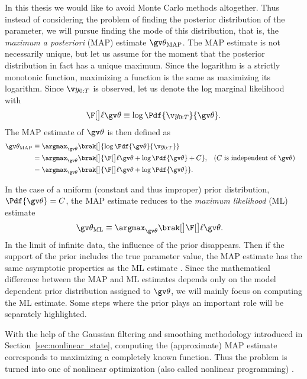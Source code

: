 In this thesis we would like to avoid Monte Carlo methods altogether. Thus instead
of considering the problem of finding the posterior distribution of the parameter,
we will pursue finding the mode of this distribution, that is, the \emph{maximum a posteriori} (MAP) estimate
$\Th_{\text{MAP}}$. The MAP estimate is not necessarily unique, 
but let us assume for the moment that the posterior distribution in fact
has a unique maximum. Since the logarithm is a strictly monotonic function, maximizing a function
is the same as maximizing its logarithm. 
Since $\Y$ is observed, let us denote 
the log marginal likelihood with 
\begin{align*}
	\lLH \equiv \log \Pdf{\Y}{\Th}.
\end{align*}
The MAP estimate of $\Th$ is then defined as 
\begin{align}
	\Th_{\text{MAP}} &\equiv \argmax_{\Th}\brak[\big]{ \log\Pdf{\Th}{\Y}} \nonumber\\ 
	&=\argmax_{\Th}\brak[\big]{\lLH + \log\Pdf{\Th}+C}, && \text{($C$ is independent of $\Th$)} \nonumber\\
	&=\argmax_{\Th}\brak[\big]{\lLH + \log\Pdf{\Th}}.
	\label{eq:MAP}
\end{align}

In the case of a uniform (constant and thus improper)
prior distribution, $\Pdf{\Th}=C$, the MAP estimate reduces to the
\emph{maximum likelihood} (ML) estimate
\begin{align}
	\Th_{\text{ML}} &\equiv \argmax_{\Th}\brak[\big]\lLH\label{eq:ML}.
\end{align}
In the limit of infinite data, the influence of the prior
disappears. Then if the support of the prior includes the true
parameter value, the MAP estimate has the same asymptotic properties
as the ML estimate \parencite{Cappe2005}. Since the mathematical difference
between the MAP and ML estimates depends only on the model dependent prior distribution
assigned to $\Th$, we will mainly focus on computing the ML estimate.
Some steps where the prior plays an important role will be separately
highlighted. 

With the help of the Gaussian filtering and smoothing methodology introduced in 
Section~\ref{sec:nonlinear_state}, computing the (approximate) MAP estimate 
corresponds to maximizing a completely known function.
Thus the problem is turned into one of nonlinear optimization 
(also called nonlinear programming) \parencite{Cappe2005}.


